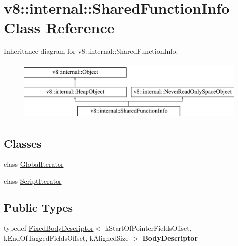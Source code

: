 \hypertarget{classv8_1_1internal_1_1SharedFunctionInfo}{}\section{v8\+:\+:internal\+:\+:Shared\+Function\+Info Class Reference}
\label{classv8_1_1internal_1_1SharedFunctionInfo}
Inheritance diagram for v8\+:\+:internal\+:\+:Shared\+Function\+Info\+:\begin{figure}[H]
\begin{center}
\leavevmode
\includegraphics[height=3.000000cm]{classv8_1_1internal_1_1SharedFunctionInfo}
\end{center}
\end{figure}
\subsection*{Classes}
\begin{DoxyCompactItemize}
\item 
class \mbox{\hyperlink{classv8_1_1internal_1_1SharedFunctionInfo_1_1GlobalIterator}{Global\+Iterator}}
\item 
class \mbox{\hyperlink{classv8_1_1internal_1_1SharedFunctionInfo_1_1ScriptIterator}{Script\+Iterator}}
\end{DoxyCompactItemize}
\subsection*{Public Types}
\begin{DoxyCompactItemize}
\item 
\mbox{\label{classv8_1_1internal_1_1SharedFunctionInfo_a32db14f4f290541c8236a51609e5a7dc}} 
typedef \mbox{\hyperlink{classv8_1_1internal_1_1FixedBodyDescriptor}{Fixed\+Body\+Descriptor}}$<$ k\+Start\+Of\+Pointer\+Fields\+Offset, k\+End\+Of\+Tagged\+Fields\+Offset, k\+Aligned\+Size $>$ {\bfseries Body\+Descriptor}
\end{DoxyCompactItemize}
